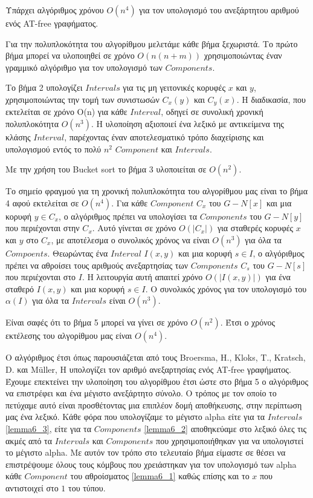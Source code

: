 \begin{definition}
	 Υπάρχει αλγόριθμος χρόνου $O(n^4)$ για τον υπολογισμό του ανεξάρτητου αριθμού ενός AT-free γραφήματος.
\end{definition}

Για την πολυπλοκότητα του αλγορίθμου μελετάμε κάθε βήμα ξεχωριστά. Το πρώτο βήμα μπορεί να υλοποιηθεί σε χρόνο $O(n(n + m))$ χρησιμοποιώντας έναν γραμμικό αλγόριθμο για τον υπολογισμό των $Components$. 

Το βήμα 2 υπολογίζει $Intervals$ για τις μη γειτονικές κορυφές $x$ και $y$, χρησιμοποιώντας την τομή των συνιστωσών $C_x(y)$ και $C_y(x)$. Η διαδικασία, που εκτελείται σε χρόνο O(n) για κάθε $Interval$, οδηγεί σε συνολική χρονική πολυπλοκότητα $O(n^3)$. Η υλοποίηση αξιοποιεί ένα λεξικό με αντικείμενα της κλάσης $Interval$, παρέχοντας έναν αποτελεσματικό τρόπο διαχείρισης και υπολογισμού εντός το πολύ $n^2$ $Component$ και $Intervals$.

Με την χρήση του Bucket sort το βήμα 3 υλοποιείται σε $O(n^2)$.

Το σημείο φραγμού για τη χρονική πολυπλοκότητα του αλγορίθμου μας είναι το βήμα 4 αφού εκτελείται σε $O(n^4)$. Για κάθε $Component$ $C_x$ του $G - N[x]$ και μια κορυφή $y \in C_x$, ο αλγόριθμος πρέπει να υπολογίσει τα $Components$ του $G - N[y]$ που περιέχονται στην $C_x$. Αυτό γίνεται σε χρόνο $O(|C_x|)$ για σταθερές κορυφές $x$ και $y$ στο $C_x$, με αποτέλεσμα ο συνολικός χρόνος να είναι $O(n^3)$ για όλα τα $Compoents$. Θεωρώντας ένα $Interval$ $I(x, y)$ και μια κορυφή $s \in I$, ο αλγόριθμος πρέπει να αθροίσει τους αριθμούς ανεξαρτησίας των $Components$ $C_s$ του $G - N[s]$ που περιέχονται στο $I$. Η λειτουργία αυτή απαιτεί χρόνο $O(|I(x, y)|)$ για ένα σταθερό $I(x, y)$ και μια κορυφή $s \in I$. Ο συνολικός χρόνος για τον υπολογισμό του $\alpha(I)$ για όλα τα $Intervals$ είναι $O(n^3)$.

Είναι σαφές ότι το βήμα 5 μπορεί να γίνει σε χρόνο $O(n^2)$. Έτσι ο χρόνος εκτέλεσης του αλγορίθμου μας
είναι $O(n^4)$.

Ο αλγόριθμος έτσι όπως παρουσιάζεται από τους Broersma, H., Kloks, T., Kratsch, D. και Müller, H υπολογίζει τον αριθμό ανεξαρτησίας ενός AT-free γραφήματος. Έχουμε επεκτείνει την υλοποίηση του αλγορίθμου έτσι ώστε στο βήμα 5 ο αλγόριθμος να επιστρέφει και ένα μέγιστο ανεξάρτητο σύνολο. Ο τρόπος με τον οποίο το πετύχαμε αυτό είναι προσθέτοντας μια επιπλέον δομή αποθήκευσης, στην περίπτωση μας ένα λεξικό. Κάθε φόρα που υπολογίζαμε το μέγιστο alpha είτε για τα $Intervals$ \ref{lemma6_3}, είτε για τα $Components$ \ref{lemma6_2} αποθηκεύαμε στο λεξικό όλες τις ακμές από τα $Intervals$ και $Components$ που χρησιμοποιήθηκαν για να υπολογιστεί το μέγιστο alpha. Με αυτόν τον τρόπο στο τελευταίο βήμα είμαστε σε θέσει να επιστρέψουμε όλους τους κόμβους που χρειάστηκαν για τον υπολογισμό των alpha κάθε $Component$ του αθροίσματος \ref{lemma6_1} καθώς επίσης και το $x$ που αντιστοιχεί στο $1$ του τύπου.  

